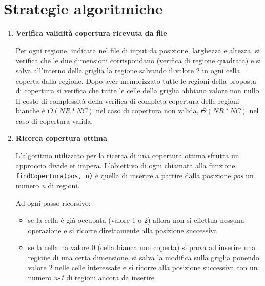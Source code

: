 \documentclass[11pt, a4paper, titlepage]{article}
\begin{document}
    \section{Strategie algoritmiche}
        \begin{enumerate}
            \item \textbf{Verifica validità copertura ricevuta da file}
            
            Per ogni regione, indicata nel file di input da posizione, larghezza e altezza, si verifica che le due dimensioni corrispondano (verifica di regione quadrata)
            e si salva all'interno della griglia la regione salvando il valore 2 in ogni cella coperta dalla regione. 
            Dopo aver memorizzato tutte le regioni della proposta di copertura si verifica che tutte le celle della griglia abbiano valore non nullo. 
            Il costo di complessità della verifica di completa copertura delle regioni bianche è
            \begin{math}
                O(NR*NC)
            \end{math}
            nel caso di copertura non valida,
            \begin{math}
                \Theta(NR*NC)
            \end{math}
            nel caso di copertura valida.
            \item \textbf{Ricerca copertura ottima}
            
            L'algoritmo utilizzato per la ricerca di una copertura ottima sfrutta un approccio divide et impera.
            L'obiettivo di ogni chiamata alla funzione \texttt{findCopertura(pos, n)} è quella di inserire a partire dalla posizione \emph{pos} un numero \emph{n} di regioni.
            
            Ad ogni passo ricorsivo:
                \begin{itemize}
                    \item se la cella è già occupata (valore 1 o 2) allora non si effettua nessuna operazione e si ricorre direttamente alla posizione successiva
                    \item se la cella ha valore 0 (cella bianca non coperta) si prova ad inserire una regione di una certa dimensione, si salva la modifica sulla griglia ponendo valore 2 nelle celle interessate
                    e si ricorre alla posizione successiva con un numero \emph{n-1} di regioni ancora da inserire
                \end{itemize}


\end{enumerate}
\end{document}
